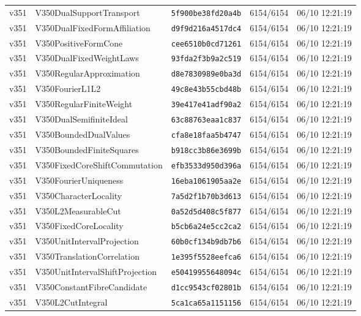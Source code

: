 \documentclass[11pt]{article}
\theoremstyle{definition}\newtheorem{deriv}{Derivation}
\begin{document}
{\begin{longtable}{@{}lllll@{}}
v351 & V350DualSupportTransport & \texttt{5f900be38fd20a4b} & 6154/6154 & 06/10 12:21:19 \\
v351 & V350DualFixedFormAffiliation & \texttt{d9f9d216a4517dc4} & 6154/6154 & 06/10 12:21:19 \\
v351 & V350PositiveFormCone & \texttt{cee6510b0cd71261} & 6154/6154 & 06/10 12:21:19 \\
v351 & V350DualFixedWeightLaws & \texttt{93fda2f3b9a2c519} & 6154/6154 & 06/10 12:21:19 \\
v351 & V350RegularApproximation & \texttt{d8e7830989e0ba3d} & 6154/6154 & 06/10 12:21:19 \\
v351 & V350FourierL1L2 & \texttt{49c8e43b55cbd48b} & 6154/6154 & 06/10 12:21:19 \\
v351 & V350RegularFiniteWeight & \texttt{39e417e41adf90a2} & 6154/6154 & 06/10 12:21:19 \\
v351 & V350DualSemifiniteIdeal & \texttt{63c88763eaa1c837} & 6154/6154 & 06/10 12:21:19 \\
v351 & V350BoundedDualValues & \texttt{cfa8e18faa5b4747} & 6154/6154 & 06/10 12:21:19 \\
v351 & V350BoundedFiniteSquares & \texttt{b918cc3b86e3699b} & 6154/6154 & 06/10 12:21:19 \\
v351 & V350FixedCoreShiftCommutation & \texttt{efb3533d950d396a} & 6154/6154 & 06/10 12:21:19 \\
v351 & V350FourierUniqueness & \texttt{16eba1061905aa2e} & 6154/6154 & 06/10 12:21:19 \\
v351 & V350CharacterLocality & \texttt{7a5d2f1b70b3d613} & 6154/6154 & 06/10 12:21:19 \\
v351 & V350L2MeasurableCut & \texttt{0a52d5d408c5f877} & 6154/6154 & 06/10 12:21:19 \\
v351 & V350FixedCoreLocality & \texttt{b5cb6a24e5cc2ca2} & 6154/6154 & 06/10 12:21:19 \\
v351 & V350UnitIntervalProjection & \texttt{60b0cf134b9db7b6} & 6154/6154 & 06/10 12:21:19 \\
v351 & V350TranslationCorrelation & \texttt{1e395f5528eefca6} & 6154/6154 & 06/10 12:21:19 \\
v351 & V350UnitIntervalShiftProjection & \texttt{e50419955648094c} & 6154/6154 & 06/10 12:21:19 \\
v351 & V350ConstantFibreCandidate & \texttt{d1cc9543cf02801b} & 6154/6154 & 06/10 12:21:19 \\
v351 & V350L2CutIntegral & \texttt{5ca1ca65a1151156} & 6154/6154 & 06/10 12:21:19 \\

\end{longtable}}
\end{document}
